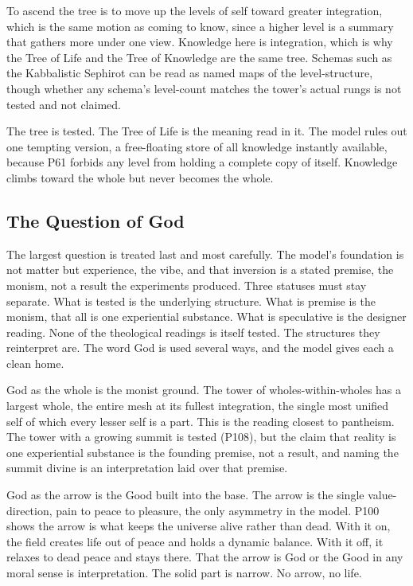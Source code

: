 To ascend the tree is to move up the levels of self toward greater integration, which is the same motion as coming to know, since a higher level is a summary that gathers more under one view. Knowledge here is integration, which is why the Tree of Life and the Tree of Knowledge are the same tree. Schemas such as the Kabbalistic Sephirot can be read as named maps of the level-structure, though whether any schema's level-count matches the tower's actual rungs is not tested and not claimed.

The tree is tested. The Tree of Life is the meaning read in it. The model rules out one tempting version, a free-floating store of all knowledge instantly available, because P61 forbids any level from holding a complete copy of itself. Knowledge climbs toward the whole but never becomes the whole.

\subsection{The Question of God}

The largest question is treated last and most carefully. The model's foundation is not matter but experience, the vibe, and that inversion is a stated premise, the monism, not a result the experiments produced. Three statuses must stay separate. What is tested is the underlying structure. What is premise is the monism, that all is one experiential substance. What is speculative is the designer reading. None of the theological readings is itself tested. The structures they reinterpret are. The word God is used several ways, and the model gives each a clean home.

God as the whole is the monist ground. The tower of wholes-within-wholes has a largest whole, the entire mesh at its fullest integration, the single most unified self of which every lesser self is a part. This is the reading closest to pantheism. The tower with a growing summit is tested (P108), but the claim that reality is one experiential substance is the founding premise, not a result, and naming the summit divine is an interpretation laid over that premise.

God as the arrow is the Good built into the base. The arrow is the single value-direction, pain to peace to pleasure, the only asymmetry in the model. P100 shows the arrow is what keeps the universe alive rather than dead. With it on, the field creates life out of peace and holds a dynamic balance. With it off, it relaxes to dead peace and stays there. That the arrow is God or the Good in any moral sense is interpretation. The solid part is narrow. No arrow, no life.

